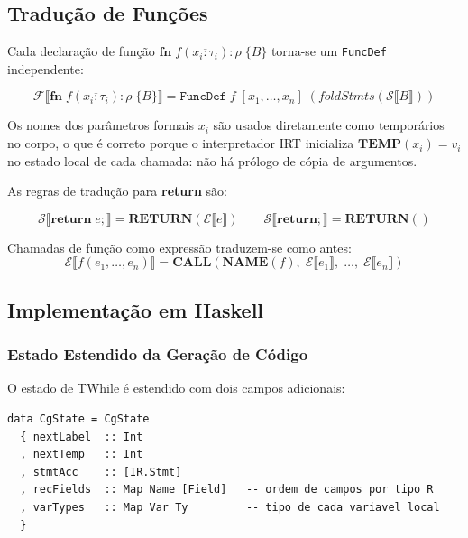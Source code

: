 \subsection{Tradução de Funções}
\label{sec:ir-timp-fn}

Cada declaração de função
\(\mathbf{fn}\; f(\overline{x_i : \tau_i}) : \rho\; \{B\}\)
torna-se um \texttt{FuncDef} independente:

\[
  \mathcal{F}\llbracket \mathbf{fn}\; f(\overline{x_i:\tau_i}):\rho\;\{B\}
  \rrbracket
  = \mathtt{FuncDef}\; f\; [x_1,\ldots,x_n]\;
  (\mathit{foldStmts}(\mathcal{S}\llbracket B \rrbracket))
\]

Os nomes dos parâmetros formais \(x_i\) são usados diretamente como
temporários no corpo, o que é correto porque o interpretador IRT inicializa
\(\mathbf{TEMP}(x_i) = v_i\) no estado local de cada chamada:
não há prólogo de cópia de argumentos.

As regras de tradução para \textbf{return} são:

\[
  \mathcal{S}\llbracket \mathbf{return}\; e \mathtt{;} \rrbracket =
  \mathbf{RETURN}(\mathcal{E}\llbracket e \rrbracket)
  \qquad
  \mathcal{S}\llbracket \mathbf{return} \mathtt{;} \rrbracket =
  \mathbf{RETURN}()
\]

Chamadas de função como expressão traduzem-se como antes:
\[
  \mathcal{E}\llbracket f(e_1,\ldots,e_n) \rrbracket =
  \mathbf{CALL}(\mathbf{NAME}(f),\;
    \mathcal{E}\llbracket e_1 \rrbracket,\;\ldots,\;
  \mathcal{E}\llbracket e_n \rrbracket)
\]

\subsection{Implementação em Haskell}
\label{sec:ir-timp-impl}

\subsubsection*{Estado Estendido da Geração de Código}

O estado de TWhile é estendido com dois campos adicionais:

\begin{verbatim}
data CgState = CgState
  { nextLabel  :: Int
  , nextTemp   :: Int
  , stmtAcc    :: [IR.Stmt]
  , recFields  :: Map Name [Field]   -- ordem de campos por tipo R
  , varTypes   :: Map Var Ty         -- tipo de cada variavel local
  }
\end{verbatim}

